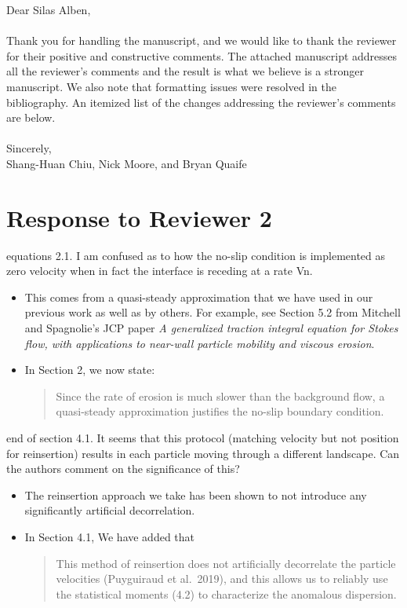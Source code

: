 \documentclass[11pt]{article}
\newcommand{\comment}[1]{{\color{blue} #1}}
\begin{document}
\noindent
Dear Silas Alben,
\\ \\
\noindent
Thank you for handling the manuscript, and we would like to thank the
reviewer for their positive and constructive comments.  The attached
manuscript addresses all the reviewer's comments and the result is what
we believe is a stronger manuscript.  We also note that formatting
issues were resolved in the bibliography. An itemized list of the
changes addressing the reviewer's comments are below.
\\ \\
\noindent
Sincerely,
\\
\noindent
Shang-Huan Chiu, Nick Moore, and Bryan Quaife

\section*{Response to Reviewer 2}

\noindent
\comment{equations 2.1.  I am confused as to how the no-slip condition
is implemented as zero velocity when in fact the interface is receding
at a rate Vn.}
\begin{itemize}
  \item This comes from a quasi-steady approximation that we have used
    in our previous work as well as by others. For example, see Section
    5.2 from Mitchell and Spagnolie's JCP paper {\em A generalized
    traction integral equation for Stokes flow, with applications to
    near-wall particle mobility and viscous erosion}.

  \item In Section 2, we now state:
    \begin{quotation}
      \noindent
      Since the rate of erosion is much slower than the background flow,
      a quasi-steady approximation justifies the no-slip boundary
      condition.
    \end{quotation}
\end{itemize}

\noindent
\comment{end of section 4.1.  It seems that this protocol (matching
velocity but not position for reinsertion) results in each particle
moving through a different landscape.  Can the authors comment on the
significance of this?}
\begin{itemize}
  \item The reinsertion approach we take has been shown to not introduce
    any significantly artificial decorrelation.

  \item In Section 4.1, We have added that
    \begin{quotation}
      \noindent
      This method of reinsertion does not artificially decorrelate the
      particle velocities (Puyguiraud et al.~2019), and this allows us
      to reliably use the statistical moments (4.2) to characterize the
      anomalous dispersion.
    \end{quotation}

\end{itemize}
\end{document}
